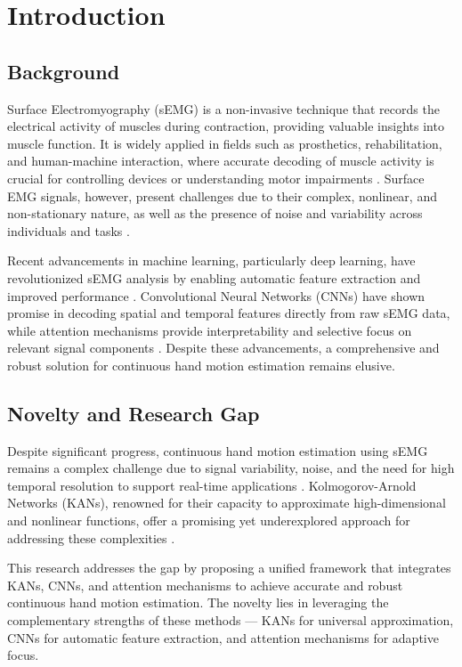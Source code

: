 \chapter{Introduction}
\label{chap:intro}

\section{Background}
Surface Electromyography (sEMG) is a non-invasive technique that records the electrical activity of muscles during contraction, providing valuable insights into muscle function. It is widely applied in fields such as prosthetics, rehabilitation, and human-machine interaction, where accurate decoding of muscle activity is crucial for controlling devices or understanding motor impairments \cite{farago2022review}. Surface EMG signals, however, present challenges due to their complex, nonlinear, and non-stationary nature, as well as the presence of noise and variability across individuals and tasks \cite{zia2018multiday, parajuli2019real}.

Recent advancements in machine learning, particularly deep learning, have revolutionized sEMG analysis by enabling automatic feature extraction and improved performance \cite{zhang2023lstm,ameri2019regression}. Convolutional Neural Networks (CNNs) have shown promise in decoding spatial and temporal features directly from raw sEMG data, while attention mechanisms provide interpretability and selective focus on relevant signal components \cite{lee2022explainable}. Despite these advancements, a comprehensive and robust solution for continuous hand motion estimation remains elusive.

\section{Novelty and Research Gap}
Despite significant progress, continuous hand motion estimation using sEMG remains a complex challenge due to signal variability, noise, and the need for high temporal resolution to support real-time applications \cite{farago2022review, zia2018multiday}. Kolmogorov-Arnold Networks (KANs), renowned for their capacity to approximate high-dimensional and nonlinear functions, offer a promising yet underexplored approach for addressing these complexities \cite{liu2024kan}.

This research addresses the gap by proposing a unified framework that integrates KANs, CNNs, and attention mechanisms to achieve accurate and robust continuous hand motion estimation. The novelty lies in leveraging the complementary strengths of these methods — KANs for universal approximation, CNNs for automatic feature extraction, and attention mechanisms for adaptive focus.

